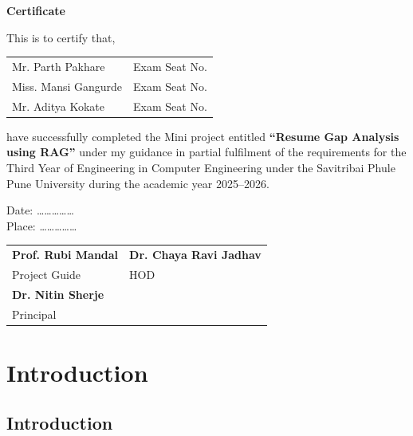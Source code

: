 \documentclass[12pt,a4paper]{report}
\begin{document}
\thispagestyle{empty}
\begin{center}
{\Large \textbf{Certificate}}
\end{center}
\vspace{0.5cm}

\noindent This is to certify that,

\vspace{0.5cm}
\begin{tabular}{ll}
Mr. Parth Pakhare & Exam Seat No.  \\
Miss. Mansi Gangurde & Exam Seat No.  \\
Mr. Aditya Kokate & Exam Seat No.  \\
\end{tabular}

\vspace{0.5cm}
\noindent have successfully completed the Mini project entitled
\textbf{``Resume Gap Analysis using RAG''} under my guidance in partial
fulfilment of the requirements for the Third Year of Engineering in Computer
Engineering under the Savitribai Phule Pune University during the academic
year 2025--2026.

\vspace{2cm}
\noindent Date: \ldots\ldots\ldots\ldots\ldots \\[0.3cm]
\noindent Place: \ldots\ldots\ldots\ldots\ldots

\vspace{2cm}
\begin{tabular}{p{5cm} p{5cm}}
\textbf{Prof. Rubi Mandal} & \textbf{Dr. Chaya Ravi Jadhav} \\
Project Guide & HOD \\[2cm]
\multicolumn{2}{l}{\textbf{Dr. Nitin Sherje}} \\
\multicolumn{2}{l}{Principal} \\
\end{tabular}

\newpage

\tableofcontents
\newpage

\chapter{Introduction}

\section{Introduction}
\end{document}
